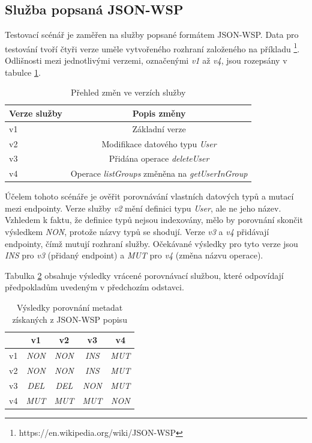 \documentclass[czech,DP]{thesiskiv}
\begin{document}
\subsection{Služba popsaná JSON-WSP}

Testovací scénář je zaměřen na služby popsané formátem JSON-WSP. Data pro testování tvoří čtyři verze uměle vytvořeného rozhraní založeného na příkladu \footnote{https://en.wikipedia.org/wiki/JSON-WSP}. Odlišnosti mezi jednotlivými verzemi, označenými \textit{v1} až \textit{v4}, jsou rozepsány v tabulce \ref{tab:json-wsp-diffs}.

\begin{table}[h]
	\centering
	\begin{tabular}{|l|c|}
		\hline
		Verze služby & Popis změny \\
		\hline
		\hline
		v1 & Základní verze \\
		\hline
		v2 & Modifikace datového typu \textit{User} \\
		\hline
		v3 & Přidána operace \textit{deleteUser} \\
		\hline
		v4 & Operace \textit{listGroups} změněna na \textit{getUserInGroup} \\
		\hline
	\end{tabular}
	\caption{Přehled změn ve verzích služby}
	\label{tab:json-wsp-diffs}
\end{table}

Účelem tohoto scénáře je ověřit porovnávání vlastních datových typů a mutací mezi endpointy. Verze služby \textit{v2} mění definici typu \textit{User}, ale ne jeho název. Vzhledem k faktu, že definice typů nejsou indexovány, mělo by porovnání skončit výsledkem \textit{NON}, protože názvy typů se shodují. Verze \textit{v3} a \textit{v4} přidávají endpointy, čímž mutují rozhraní služby. Očekávané výsledky pro tyto verze jsou \textit{INS} pro \textit{v3} (přidaný endpoint) a \textit{MUT} pro \textit{v4} (změna názvu operace).

Tabulka \ref{tab:jsonwsp-cmp-res} obsahuje výsledky vrácené porovnávací službou, které odpovídají předpokladům uvedeným v předchozím odstavci.

\begin{table}[h]
	\centering
	\begin{tabular}{|l||c|c|c|c|}
		\hline
		& v1 & v2 & v3 & v4 \\
		\hline
		\hline
		v1 & \textit{NON} & \textit{NON} & \textit{INS} & \textit{MUT} \\
		\hline
		v2 & \textit{NON} & \textit{NON} & \textit{INS} & \textit{MUT} \\
		\hline
		v3 & \textit{DEL} & \textit{DEL} & \textit{NON} & \textit{MUT} \\
		\hline
		v4 & \textit{MUT} & \textit{MUT} & \textit{MUT} & \textit{NON} \\
		\hline
	\end{tabular}
	\caption{Výsledky porovnání metadat získaných z JSON-WSP popisu}
	\label{tab:jsonwsp-cmp-res}
\end{table}
\end{document}
